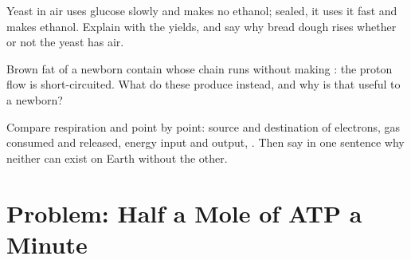 \begin{exercise}[$\star\star\star$]\label{exo:g12:respiration-fermentation:13}
Yeast in air uses glucose slowly and makes no ethanol; sealed, it uses
it fast and makes ethanol. Explain with the yields, and say why bread
dough rises whether or not the yeast has air.
\end{exercise}

\begin{exercise}[$\star\star\star$]\label{exo:g12:respiration-fermentation:14}
Brown fat  of a newborn contain  whose chain runs
without making : the proton flow is short-circuited. What do these
 produce instead, and why is that useful to a newborn?
\end{exercise}

\begin{exercise}[$\star\star\star$]\label{exo:g12:respiration-fermentation:15}
Compare respiration and  point by point: source and
destination of electrons, gas consumed and released, energy input and
output, . Then say in one sentence why neither can exist on
Earth without the other.
\end{exercise}

\section{Problem: Half a Mole of ATP a Minute}

